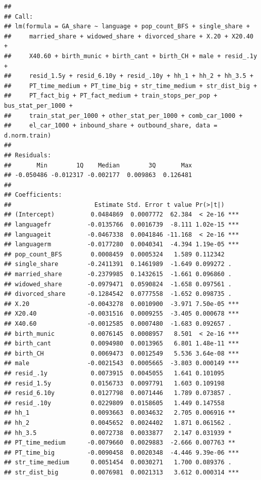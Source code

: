 \documentclass[
]{article}
\begin{document}
\begin{verbatim}
## 
## Call:
## lm(formula = GA_share ~ language + pop_count_BFS + single_share + 
##     married_share + widowed_share + divorced_share + X.20 + X20.40 + 
##     X40.60 + birth_munic + birth_cant + birth_CH + male + resid_.1y + 
##     resid_1.5y + resid_6.10y + resid_.10y + hh_1 + hh_2 + hh_3.5 + 
##     PT_time_medium + PT_time_big + str_time_medium + str_dist_big + 
##     PT_fact_big + PT_fact_medium + train_stops_per_pop + bus_stat_per_1000 + 
##     train_stat_per_1000 + other_stat_per_1000 + comb_car_1000 + 
##     el_car_1000 + inbound_share + outbound_share, data = d.norm.train)
## 
## Residuals:
##       Min        1Q    Median        3Q       Max 
## -0.050486 -0.012317 -0.002177  0.009863  0.126481 
## 
## Coefficients:
##                       Estimate Std. Error t value Pr(>|t|)    
## (Intercept)          0.0484869  0.0007772  62.384  < 2e-16 ***
## languagefr          -0.0135766  0.0016739  -8.111 1.02e-15 ***
## languageit          -0.0467338  0.0041846 -11.168  < 2e-16 ***
## languagerm          -0.0177280  0.0040341  -4.394 1.19e-05 ***
## pop_count_BFS        0.0008459  0.0005324   1.589 0.112342    
## single_share        -0.2411391  0.1461989  -1.649 0.099272 .  
## married_share       -0.2379985  0.1432615  -1.661 0.096860 .  
## widowed_share       -0.0979471  0.0590824  -1.658 0.097561 .  
## divorced_share      -0.1284542  0.0777558  -1.652 0.098735 .  
## X.20                -0.0043278  0.0010900  -3.971 7.50e-05 ***
## X20.40              -0.0031516  0.0009255  -3.405 0.000678 ***
## X40.60              -0.0012585  0.0007480  -1.683 0.092657 .  
## birth_munic          0.0076145  0.0008957   8.501  < 2e-16 ***
## birth_cant           0.0094980  0.0013965   6.801 1.48e-11 ***
## birth_CH             0.0069473  0.0012549   5.536 3.64e-08 ***
## male                -0.0021543  0.0005665  -3.803 0.000149 ***
## resid_.1y            0.0073915  0.0045055   1.641 0.101095    
## resid_1.5y           0.0156733  0.0097791   1.603 0.109198    
## resid_6.10y          0.0127798  0.0071446   1.789 0.073857 .  
## resid_.10y           0.0229809  0.0158605   1.449 0.147558    
## hh_1                 0.0093663  0.0034632   2.705 0.006916 ** 
## hh_2                 0.0045652  0.0024402   1.871 0.061562 .  
## hh_3.5               0.0072738  0.0033877   2.147 0.031939 *  
## PT_time_medium      -0.0079660  0.0029883  -2.666 0.007763 ** 
## PT_time_big         -0.0090458  0.0020348  -4.446 9.39e-06 ***
## str_time_medium      0.0051454  0.0030271   1.700 0.089376 .  
## str_dist_big         0.0076981  0.0021313   3.612 0.000314 ***

\end{verbatim}
\end{document}
